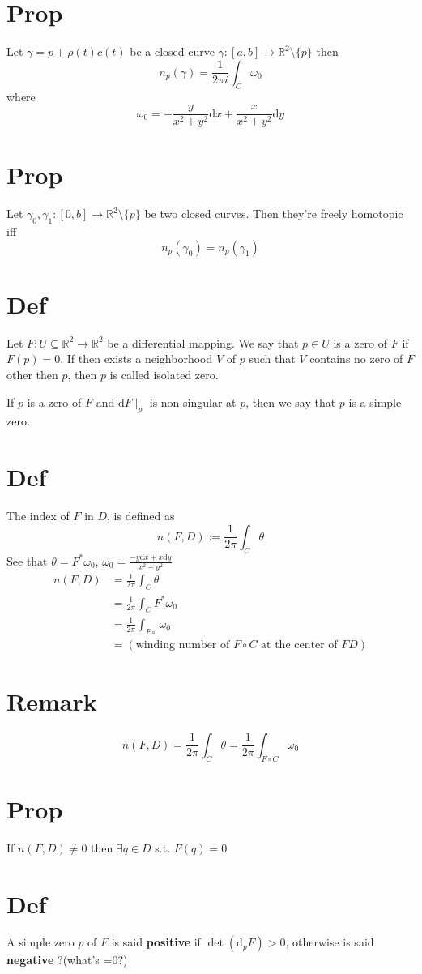\documentclass{article}
\begin{document}
\section{Prop}
Let $\gamma=p+\rho(t)c(t)$ be a closed curve $\gamma:[a,b]\rightarrow \mathbb{R}^2\setminus\{p\}$ then
$$n_p(\gamma)=\frac{1}{2\pi i}\int_C\omega_0$$
where $$\omega_0=-\frac{y}{x^2+y^2}\text{d} x+\frac{x}{x^2+y^2}\text{d}y$$
\section{Prop}
Let $\gamma_0,\gamma_1:[0,b]\rightarrow\mathbb{R}^2\setminus\{p\}$ be two closed curves. Then they're freely homotopic iff$$n_p(\gamma_0)=n_p(\gamma_1)$$
\section{Def}
Let $F:U\subseteq \mathbb{R}^2\rightarrow\mathbb{R}^2$ be a differential mapping. We say that $p\in U$ is a zero of $F$ if $F(p)=0$. If then exists a neighborhood $V$ of $p$ such that $V$ contains no zero of $F$ other then $p$,  then $p$ is called isolated zero.

If $p$ is a zero of $F$ and $\text{d}F\mid_p$ is non singular at $p$, then we say that $p$ is a simple zero.
\section{Def} The index of $F$ in $D$, is defined as
$$n(F,D):=\frac{1}{2\pi}\int_C\theta$$
See that $\theta=F^*\omega_0$, $\omega_0=\frac{-y\text{d}x+x\text{d}y}{x^2+y^2}$
$$\begin{aligned}
    n(F,D)&=\frac{1}{2\pi}\int_C\theta\\
    &=\frac{1}{2\pi}\int_CF^*\omega_0\\
    &=\frac{1}{2\pi}\int_{F\circ}\omega_0\\
    &=(\text{winding number of }F\circ C\text{ at the center of }F D)
\end{aligned}$$ 
\section{Remark}
$$n(F,D)=\frac{1}{2\pi}\int_C\theta=\frac{1}{2\pi}\int_{F\circ C}\omega_0$$
\section{Prop}
If $n(F,D)\neq 0$ then $\exists q\in D$ s.t. $F(q)=0$
\section{Def}
A simple zero $p$ of $F$ is said \textbf{positive} if $\det(\text{d}_p F)>0$, otherwise is said \textbf{negative} ?(what's =0?)
\end{document}
